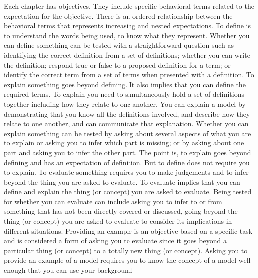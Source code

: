 Each chapter has objectives. They include specific behavioral terms related to the expectation for the objective. There is an ordered relationship between the behavioral terms that represents increasing and nested expectations. To define is to understand the words being used, to know what they represent. Whether you can define something can be tested with a straightforward question such as identifying the correct definition from a set of definitions; whether you can write the definition; respond true or false to a proposed definition for a term; or identify the correct term from a set of terms when presented with a definition. To explain something goes beyond defining. It also implies that you can define the required terms. To explain\footnotemark{} you need to simultaneously hold a set of definitions together including how they relate to one another. You can explain a model by demonstrating that you know all the definitions involved, and describe how they relate to one another, and can communicate that explanation. Whether you can explain something can be tested by asking about several aspects of what you are to explain or asking you to infer which part is missing; or by asking about one part and asking you to infer the other part. The point is, to explain goes beyond defining and has an expectation of definition. But to define does not require you to explain. To evaluate something requires you to make judgements and to infer beyond the thing you are asked to evaluate. To evaluate implies that you can define and explain the thing (or concept) you are asked to evaluate. Being tested for whether you can evaluate can include asking you to infer to or from something that has not been directly covered or discussed, going beyond the thing (or concept)\footnotemark{} you are asked to evaluate to consider its implications in different situations. Providing an example is an objective based on a specific task and is considered a form of asking you to evaluate since it goes beyond a particular thing (or concept) to a totally new thing (or concept). Asking you to provide an example of a model requires you to know the concept of a model well enough that you can use your background 